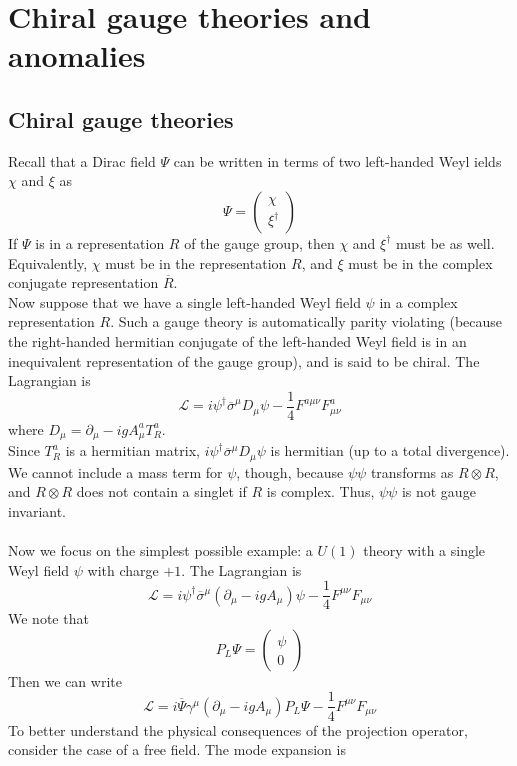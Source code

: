 \documentclass[cyan]{elegantnote}
\begin{document}
\section{Chiral gauge theories and anomalies}
\subsection{Chiral gauge theories}
Recall that a Dirac field $\Psi$ can be written in terms of two left-handed Weyl ields $\chi$ and $\xi$ as
\[\Psi = \begin{pmatrix}\chi\\ \xi^{\dagger} \end{pmatrix}\] If $\Psi$ is in a representation $R$ of the gauge group, then $\chi$ and $\xi^{\dagger}$ must be as well. Equivalently, $\chi$ must be in the representation $R$, and $\xi$ must be in the complex conjugate representation $\overline{R}$.
\\
Now suppose that we have a single left-handed Weyl field $\psi$ in a complex representation $R$. Such a gauge theory is automatically parity violating (because the right-handed hermitian conjugate of the left-handed Weyl field is in an inequivalent representation of the gauge group), and is said to be chiral.
The Lagrangian is
\[\mathcal{L} = i\psi^{\dagger} \overline{\sigma}^{\mu} D_{\mu} \psi - \frac{1}{4}F^{a\mu\nu}F^a_{\mu\nu}\]
where $D_{\mu} = \partial_{\mu} - igA^{a}_{\mu} T^a_R$.
\\
Since $T^a_R$ is a hermitian matrix, $i\psi^{\dagger} \overline{\sigma}^{\mu} D_{\mu} \psi$ is hermitian (up to a total divergence). We cannot include a mass term for $\psi$, though, because $\psi\psi$ transforms as $R \otimes R$, and $R \otimes R$ does not contain a singlet if $R$ is complex. Thus, $\psi\psi$ is not gauge invariant. 
\\ \\
Now we focus on the simplest possible example: a $U(1)$ theory with a single Weyl field $\psi$ with charge $+1$. The Lagrangian is
\[\mathcal{L} = i\psi^{\dagger} \overline{\sigma}^{\mu} (\partial_{\mu} - igA_{\mu}) \psi - \frac{1}{4}F^{\mu\nu}F_{\mu\nu}\]
We note that
\[P_L \Psi = \begin{pmatrix}
\psi \\ 0
\end{pmatrix}\]
Then we can write
\[\mathcal{L} = i\overline{\Psi} \gamma^{\mu} (\partial_{\mu} - igA_{\mu}) P_L\Psi - \frac{1}{4}F^{\mu\nu}F_{\mu\nu}\]
To better understand the physical consequences of the projection operator, consider the case of a free field. The mode expansion is
\end{document}

